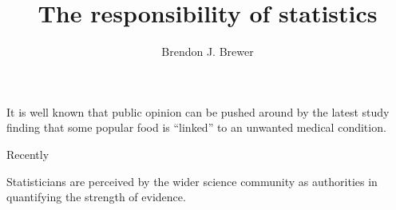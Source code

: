 \documentclass[letterpaper, 11pt]{article}
\title{The responsibility of statistics}
\author{Brendon J. Brewer}
\begin{document}
\maketitle


It is well known that public opinion can be pushed around by the latest study
finding that some popular food is ``linked'' to an unwanted medical condition.

Recently 

Statisticians are perceived by the wider science community as authorities in
quantifying the strength of evidence.
\end{document}
